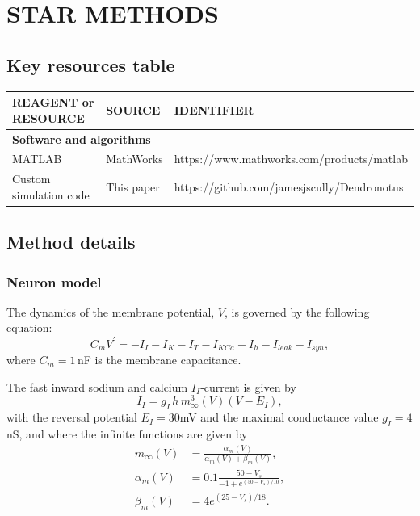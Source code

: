 \section*{STAR METHODS}

\subsection*{Key resources table}

\begin{tabular}{|l|l|l|}
\hline
\textbf{REAGENT or RESOURCE} & \textbf{SOURCE} & \textbf{IDENTIFIER} \\
\hline
\multicolumn{3}{|l|}{\textbf{Software and algorithms}} \\
\hline
MATLAB & MathWorks & https://www.mathworks.com/products/matlab \\
\hline
Custom simulation code & This paper & https://github.com/jamesjscully/Dendronotus \\
\hline
\end{tabular}


\subsection*{Method details}

\subsubsection*{Neuron model}

The dynamics of the membrane potential, $V$, is governed by the following equation:
\begin{equation}
 	C_{m} {V}^\prime = -I_{I} - I_K - I_{T}  - I_{KCa} -  I_{h}  - I_{leak}  - I_{syn},
\end{equation}
where $C_m = 1$\,nF is the membrane capacitance.

The fast inward sodium and calcium $I_{I}$-current is given by
\begin{equation}
I_{I}=g_{I}\,h\, m^{3}_{\infty}(V)(V-E_{I}),
\end{equation}
with the reversal potential $E_{I}=30$mV and the maximal conductance value $g_{I}=4$nS, and where the infinite functions are given by
\begin{align}
 m_{\infty}(V) &= \frac{\alpha_{m}(V)}{\alpha_{m}(V) +\beta_{m}(V)},   \\
 \alpha_{m}(V) &= 0.1 \frac{50-V_s}{-1+e^{(50-V_s)/10}}, \\
 \beta_{m}(V) &= 4 e^{(25-V_s)/18}.
\end{align}


